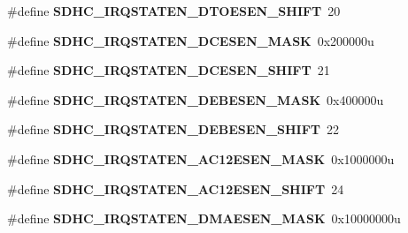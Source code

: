 \begin{DoxyCompactItemize}
\item 
\#define {\bfseries S\+D\+H\+C\+\_\+\+I\+R\+Q\+S\+T\+A\+T\+E\+N\+\_\+\+D\+T\+O\+E\+S\+E\+N\+\_\+\+S\+H\+I\+FT}~20\hypertarget{group__SDHC__Register__Masks_gaaa65471aa5dc9354ffbc0f74257c7445}{}\label{group__SDHC__Register__Masks_gaaa65471aa5dc9354ffbc0f74257c7445}

\item 
\#define {\bfseries S\+D\+H\+C\+\_\+\+I\+R\+Q\+S\+T\+A\+T\+E\+N\+\_\+\+D\+C\+E\+S\+E\+N\+\_\+\+M\+A\+SK}~0x200000u\hypertarget{group__SDHC__Register__Masks_ga8a3e8003463ce6afcf39fef7e4938377}{}\label{group__SDHC__Register__Masks_ga8a3e8003463ce6afcf39fef7e4938377}

\item 
\#define {\bfseries S\+D\+H\+C\+\_\+\+I\+R\+Q\+S\+T\+A\+T\+E\+N\+\_\+\+D\+C\+E\+S\+E\+N\+\_\+\+S\+H\+I\+FT}~21\hypertarget{group__SDHC__Register__Masks_ga0050daa198388d3a52844f1626e0fd75}{}\label{group__SDHC__Register__Masks_ga0050daa198388d3a52844f1626e0fd75}

\item 
\#define {\bfseries S\+D\+H\+C\+\_\+\+I\+R\+Q\+S\+T\+A\+T\+E\+N\+\_\+\+D\+E\+B\+E\+S\+E\+N\+\_\+\+M\+A\+SK}~0x400000u\hypertarget{group__SDHC__Register__Masks_ga1a3c5402282178d4d694355f5bca0870}{}\label{group__SDHC__Register__Masks_ga1a3c5402282178d4d694355f5bca0870}

\item 
\#define {\bfseries S\+D\+H\+C\+\_\+\+I\+R\+Q\+S\+T\+A\+T\+E\+N\+\_\+\+D\+E\+B\+E\+S\+E\+N\+\_\+\+S\+H\+I\+FT}~22\hypertarget{group__SDHC__Register__Masks_ga7911ed6d7633685d285f4934e301bde6}{}\label{group__SDHC__Register__Masks_ga7911ed6d7633685d285f4934e301bde6}

\item 
\#define {\bfseries S\+D\+H\+C\+\_\+\+I\+R\+Q\+S\+T\+A\+T\+E\+N\+\_\+\+A\+C12\+E\+S\+E\+N\+\_\+\+M\+A\+SK}~0x1000000u\hypertarget{group__SDHC__Register__Masks_gab127f67378a192bb2db22591ef7d39f7}{}\label{group__SDHC__Register__Masks_gab127f67378a192bb2db22591ef7d39f7}

\item 
\#define {\bfseries S\+D\+H\+C\+\_\+\+I\+R\+Q\+S\+T\+A\+T\+E\+N\+\_\+\+A\+C12\+E\+S\+E\+N\+\_\+\+S\+H\+I\+FT}~24\hypertarget{group__SDHC__Register__Masks_ga14c140e22b678c345119a68af9bef146}{}\label{group__SDHC__Register__Masks_ga14c140e22b678c345119a68af9bef146}

\item 
\#define {\bfseries S\+D\+H\+C\+\_\+\+I\+R\+Q\+S\+T\+A\+T\+E\+N\+\_\+\+D\+M\+A\+E\+S\+E\+N\+\_\+\+M\+A\+SK}~0x10000000u\hypertarget{group__SDHC__Register__Masks_ga3f042673e4eb942992f5f5c670e3f3d7}{}\label{group__SDHC__Register__Masks_ga3f042673e4eb942992f5f5c670e3f3d7}


\end{DoxyCompactItemize}
